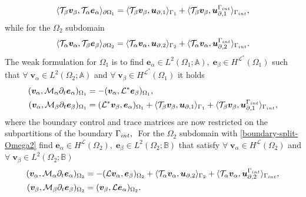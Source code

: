 \documentclass[11pt,a4paper]{article}
\newcommand{\innerproduct}[3][\Omega]{(#2, #3)_{#1}}
\newcommand{\boundary}[3][\partial\Omega]{\langle #2, #3\rangle_{#1}}
\begin{document}
\begin{equation}
    \boundary[\partial\Omega_1]{\mathcal{T}_{\beta}\bm{v}_\beta}{\mathcal{T}_{\alpha}\bm{e}_\alpha} = \boundary[\Gamma_1]{\mathcal{T}_{\beta}\bm{v}_\beta}{\bm{u}_{\partial,1}} + \boundary[\Gamma_{\rm int}]{\mathcal{T}_{\beta}\bm{v}_\beta}{\bm{u}_{\partial,1}^{\Gamma_{\rm int}}},
\label{eq:boundary-split-Omega1}
\end{equation}
while for the $\Omega_2$ subdomain 
\begin{equation}
    \boundary[\partial\Omega_2]{\mathcal{T}_{\alpha}\bm{v}_\alpha}{\mathcal{T}_{\beta}\bm{e}_\beta} = \boundary[\Gamma_2]{\mathcal{T}_{\alpha}\bm{v}_\alpha}{\bm{u}_{\partial,2}} + \boundary[\Gamma_{\rm int}]{\mathcal{T}_{\alpha}\bm{v}_\alpha}{\bm{u}_{\partial,2}^{\Gamma_{\rm int}}}.
\label{boundary-split-Omega2}
\end{equation}
The weak formulation for $\Omega_1$ is to find $\bm{e}_\alpha \in L^2(\Omega_1; \mathbb{A}), \; \bm{e}_\beta \in H^{\mathcal{L^*}}(\Omega_1)$ such that $\forall \; \bm{v}_\alpha \in L^2(\Omega_2; \mathbb{A})$ and $\forall \; \bm{v}_\beta \in H^{\mathcal{L^*}}(\Omega_1)$ it holds
\begin{equation}
    \begin{aligned}
        \innerproduct[\Omega_1]{\bm{v}_\alpha}{\mathcal{M}_\alpha\partial_t\bm{e}_\alpha} &= - \innerproduct[\Omega_1]{\bm{v}_\alpha}{\mathcal{L}^*\bm{e}_\beta}, \\
        \innerproduct[\Omega_1]{\bm{v}_\alpha}{\mathcal{M}_\beta\partial_t\bm{e}_\beta} &= \innerproduct[\Omega_1]{\mathcal{L}^*\bm{v}_\beta}{\bm{e}_\alpha} + \boundary[\Gamma_1]{\mathcal{T}_{\beta}\bm{v}_\beta}{\bm{u}_{\partial,1}} + \boundary[\Gamma_{\rm int}]{\mathcal{T}_{\beta}\bm{v}_\beta}{\bm{u}_{\partial,1}^{\Gamma_{\rm int}}},
    \end{aligned}
\label{eq:weak-form-L*}
\end{equation}
where the boundary control and trace matrices are now restricted on the subpartitions  of the boundary $\Gamma_{\rm int}, \; $
 For the $\Omega_2$ subdomain with \ref{boundary-split-Omega2} find $\bm{e}_\alpha\in H^\mathcal{L}(\Omega_2), \;\bm{e}_\beta \in L^2(\Omega_2; \mathbb{B})$ that satisfy $\forall \; \bm{v}_\alpha \in H^{\mathcal{L}}(\Omega_2)$ and $\forall \; \bm{v}_\beta \in L^2(\Omega_2; \mathbb{B})$
\begin{equation}
    \begin{aligned}
        \innerproduct[\Omega_2]{\bm{v}_\alpha}{\mathcal{M}_\alpha\partial_t\bm{e}_\alpha} &= -\innerproduct[\Omega_2]{\mathcal{L}\bm{v}_\alpha}{\bm{e}_\beta} + \boundary[\Gamma_2]{\mathcal{T}_{\alpha}\bm{v}_\alpha}{\bm{u}_{\partial,2}} + \boundary[\Gamma_{\rm int}]{\mathcal{T}_{\alpha}\bm{v}_\alpha}{\bm{u}_{\partial,2}^{\Gamma_{\rm int}}}, \\
        \innerproduct[\Omega_2]{\bm{v}_\beta}{\mathcal{M}_\beta\partial_t\bm{e}_\beta} &= \innerproduct[\Omega_2]{\bm{v}_\beta}{\mathcal{L}\bm{e}_\alpha}.
    \end{aligned}
\label{eq:weak-form-L}
\end{equation}
\end{document}
